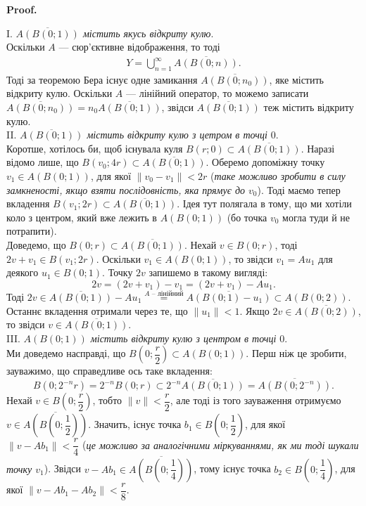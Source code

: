 \documentclass[a4paper, 10pt]{article}
\makeatletter
\theoremstyle{theoremdd}
\theoremstyle{theoremdd}
\theoremstyle{theoremdd}
\theoremstyle{theoremdd}
\theoremstyle{theoremdd}
\theoremstyle{theoremdd}
\theoremstyle{theoremdd}
\theoremstyle{theoremdd}
\renewenvironment{proof}[1][Proof.\\]{\par
\pushQED{\hfill \qed}%
\normalfont \topsep6\p@\@plus6\p@\relax
\trivlist
\item\relax
{\bfseries
#1\@addpunct{.}}\hspace\labelsep\ignorespaces
}{%
\popQED\endtrivlist\@endpefalse
}
\makeatother
\begin{document}
\begin{proof}
I. \textit{$\overline{A(B(0;1))}$ містить якусь відкриту кулю}.\\
Оскільки $A$ --- сюр'єктивне відображення, то тоді
\begin{align*}
Y = \bigcup_{n =1}^\infty \overline{A(B(0;n))}.
\end{align*}
Тоді за теоремою Бера існує одне замикання $\overline{A(B(0;n_0))}$, яке містить відкриту кулю. Оскільки $A$ --- лінійний оператор, то можемо записати $\overline{A(B(0;n_0))} = n_0 \overline{A(B(0;1))}$, звідси $\overline{A(B(0;1))}$ теж містить відкриту кулю.
\bigskip \\
II. \textit{$\overline{A(B(0;1))}$ містить відкриту кулю з цетром в точці $0$}.\\
Коротше, хотілось би, щоб існувала куля $B(r;0) \subset \overline{A(B(0;1))}$. Наразі відомо лише, що $B(v_0;4r) \subset \overline{A(B(0;1))}$. Оберемо допоміжну точку $v_1 \in A(B(0;1))$, для якої $\| v_0 - v_1 \| < 2r$ (\textit{таке можливо зробити в силу замкненості, якщо взяти послідовність, яка прямує до $v_0$}). Тоді маємо тепер вкладення $B(v_1;2r) \subset \overline{A(B(0;1))}$. Ідея тут полягала в тому, що ми хотіли коло з центром, який вже лежить в $A(B(0;1))$ (бо точка $v_0$ могла туди й не потрапити).\\
Доведемо, що $B(0;r) \subset \overline{A(B(0;1))}$. Нехай $v \in B(0;r)$, тоді $2v + v_1 \in B(v_1;2r)$. Оскільки $v_1 \in A(B(0;1))$, то звідси $v_1 = Au_1$ для деякого $u_1 \in B(0;1)$. Точку $2v$ запишемо в такому вигляді:
\[
2v = (2v+v_1) -v_1 = (2v+v_1) - Au_1.
\]
Тоді $2v \in \overline{A(B(0;1))} - Au_1 \overset{A \text{ -- лінійний}}{=} \overline{A(B(0;1) - u_1)} \subset A(B(0;2))$. Останнє вкладення отримали через те, що $\|u_1\| < 1$. Якщо $2v \in \overline{A(B(0;2))}$, то звідси $v \in \overline{A(B(0;1))}$.
\bigskip \\
III. \textit{$A(B(0;1))$ містить відкриту кулю з центром в точці $0$}.\\
Ми доведемо насправді, що $B\left( 0; \dfrac{r}{2} \right) \subset A(B(0;1))$. Перш ніж це зробити, зауважимо, що справедливе ось таке вкладення:
\[
B(0; 2^{-n}r) = 2^{-n} B(0;r) \subset 2^{-n} \overline{A(B(0;1))} = \overline{A(B(0;2^{-n}))}.
\]
Нехай $v \in B\left( 0; \dfrac{r}{2} \right)$, тобто $\| v \| < \dfrac{r}{2}$, але тоді із того зауваження отримуємо $v \in \overline{A\left( B \left( 0;\dfrac{1}{2} \right) \right)}$. Значить, існує точка $b_1 \in B\left( 0;\dfrac{1}{2} \right)$, для якої $\| v - Ab_1 \| < \dfrac{r}{4}$ (\textit{це можливо за аналогічними міркуваннями, як ми тоді шукали точку $v_1$}). Звідси $v - Ab_1 \in \overline{A\left(B\left( 0;\dfrac{1}{4} \right) \right)}$, тому існує точка $b_2 \in B\left(0;\dfrac{1}{4}\right)$, для якої $\| v - Ab_1 - Ab_2 \| < \dfrac{r}{8}$.\\

\end{proof}
\end{document}
